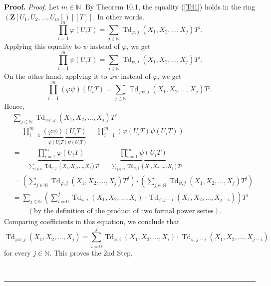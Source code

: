 \documentclass[numbers=enddot,12pt,final,onecolumn,notitlepage]{scrartcl}%
\newenvironment{proof}[1][Proof]{\noindent\textbf{#1.} }{\ \rule{0.5em}{0.5em}}
\begin{document}
\begin{proof}
\textit{Proof.} Let $m\in\mathbb{N}$. By Theorem 10.1, the equality
(\ref{Td1}) holds in the ring $\left(  \mathbf{Z}\left[  U_{1},U_{2}%
,...,U_{m}\right]  \right)  \left[  \left[  T\right]  \right]  $. In other
words,%
\[
\prod\limits_{i=1}^{m}\varphi\left(  U_{i}T\right)  =\sum\limits_{j\in
\mathbb{N}}\operatorname*{Td}\nolimits_{\varphi,j}\left(  X_{1},X_{2}%
,...,X_{j}\right)  T^{j}.
\]
Applying this equality to $\psi$ instead of $\varphi$, we get%
\[
\prod\limits_{i=1}^{m}\psi\left(  U_{i}T\right)  =\sum\limits_{j\in\mathbb{N}%
}\operatorname*{Td}\nolimits_{\psi,j}\left(  X_{1},X_{2},...,X_{j}\right)
T^{j}.
\]
On the other hand, applying it to $\varphi\psi$ instead of $\varphi$, we get%
\[
\prod\limits_{i=1}^{m}\left(  \varphi\psi\right)  \left(  U_{i}T\right)
=\sum\limits_{j\in\mathbb{N}}\operatorname*{Td}\nolimits_{\varphi\psi
,j}\left(  X_{1},X_{2},...,X_{j}\right)  T^{j}.
\]
Hence,%
\begin{align*}
&  \sum\limits_{j\in\mathbb{N}}\operatorname*{Td}\nolimits_{\varphi\psi
,j}\left(  X_{1},X_{2},...,X_{j}\right)  T^{j}\\
&  =\prod\limits_{i=1}^{m}\underbrace{\left(  \varphi\psi\right)  \left(
U_{i}T\right)  }_{=\varphi\left(  U_{i}T\right)  \psi\left(  U_{i}T\right)
}=\prod\limits_{i=1}^{m}\left(  \varphi\left(  U_{i}T\right)  \psi\left(
U_{i}T\right)  \right) \\
&  =\underbrace{\prod\limits_{i=1}^{m}\varphi\left(  U_{i}T\right)  }%
_{=\sum\limits_{j\in\mathbb{N}}\operatorname*{Td}\nolimits_{\varphi,j}\left(
X_{1},X_{2},...,X_{j}\right)  T^{j}}\cdot\underbrace{\prod\limits_{i=1}%
^{m}\psi\left(  U_{i}T\right)  }_{=\sum\limits_{j\in\mathbb{N}}%
\operatorname*{Td}\nolimits_{\psi,j}\left(  X_{1},X_{2},...,X_{j}\right)
T^{j}}\\
&  =\left(  \sum\limits_{j\in\mathbb{N}}\operatorname*{Td}\nolimits_{\varphi
,j}\left(  X_{1},X_{2},...,X_{j}\right)  T^{j}\right)  \cdot\left(
\sum\limits_{j\in\mathbb{N}}\operatorname*{Td}\nolimits_{\psi,j}\left(
X_{1},X_{2},...,X_{j}\right)  T^{j}\right) \\
&  =\sum\limits_{j\in\mathbb{N}}\left(  \sum_{i=0}^{j}\operatorname*{Td}%
\nolimits_{\varphi,i}\left(  X_{1},X_{2},...,X_{i}\right)  \cdot
\operatorname*{Td}\nolimits_{\psi,j-i}\left(  X_{1},X_{2},...,X_{j-i}\right)
\right)  T^{j}\\
&  \ \ \ \ \ \ \ \ \ \ \left(  \text{by the definition of the product of two
formal power series}\right)  .
\end{align*}
Comparing coefficients in this equation, we conclude that%
\[
\operatorname*{Td}\nolimits_{\varphi\psi,j}\left(  X_{1},X_{2},...,X_{j}%
\right)  =\sum_{i=0}^{j}\operatorname*{Td}\nolimits_{\varphi,i}\left(
X_{1},X_{2},...,X_{i}\right)  \cdot\operatorname*{Td}\nolimits_{\psi
,j-i}\left(  X_{1},X_{2},...,X_{j-i}\right)
\]
for every $j\in\mathbb{N}$. This proves the 2nd Step.


\end{proof}
\end{document}

